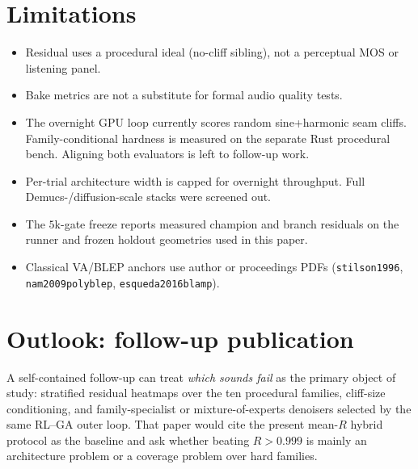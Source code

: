 \section{Limitations}
\label{sec:limitations}

\begin{itemize}
  \item Residual uses a procedural ideal (no-cliff sibling), not a perceptual MOS or listening panel.
  \item Bake metrics are not a substitute for formal audio quality tests.
  \item The overnight GPU loop currently scores random sine+harmonic seam cliffs. Family-conditional hardness is measured on the separate Rust procedural bench. Aligning both evaluators is left to follow-up work.
  \item Per-trial architecture width is capped for overnight throughput. Full Demucs-/diffusion-scale stacks were screened out.
  \item The $5$k-gate freeze reports measured champion and branch residuals on the runner and frozen holdout geometries used in this paper.
  \item Classical VA/BLEP anchors use author or proceedings PDFs (\texttt{stilson1996}, \texttt{nam2009polyblep}, \texttt{esqueda2016blamp}).
\end{itemize}

\section{Outlook: follow-up publication}
\label{sec:outlook}

A self-contained follow-up can treat \emph{which sounds fail} as the primary object of study: stratified residual heatmaps over the ten procedural families, cliff-size conditioning, and family-specialist or mixture-of-experts denoisers selected by the same RL--GA outer loop.
That paper would cite the present mean-$R$ hybrid protocol as the baseline and ask whether beating $R>0.999$ is mainly an architecture problem or a coverage problem over hard families.
